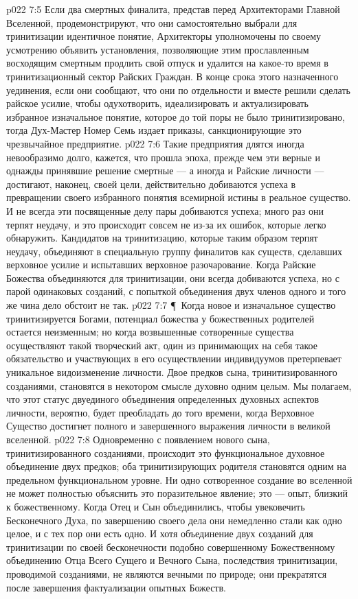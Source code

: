 \vs p022 7:5 Если два смертных финалита, представ перед Архитекторами Главной Вселенной, продемонстрируют, что они самостоятельно выбрали для тринитизации идентичное понятие, Архитекторы уполномочены по своему усмотрению объявить установления, позволяющие этим прославленным восходящим смертным продлить свой отпуск и удалится на какое\hyp{}то время в тринитизационный сектор Райских Граждан. В конце срока этого назначенного уединения, если они сообщают, что они по отдельности и вместе решили сделать райское усилие, чтобы одухотворить, идеализировать и актуализировать избранное изначальное понятие, которое до той поры не было тринитизировано, тогда Дух\hyp{}Мастер Номер Семь издает приказы, санкционирующие это чрезвычайное предприятие.
\vs p022 7:6 Такие предприятия длятся иногда невообразимо долго, кажется, что прошла эпоха, прежде чем эти верные и однажды принявшие решение смертные --- а иногда и Райские личности --- достигают, наконец, своей цели, действительно добиваются успеха в превращении своего избранного понятия всемирной истины в реальное существо. И не всегда эти посвященные делу пары добиваются успеха; много раз они терпят неудачу, и это происходит совсем не из\hyp{}за их ошибок, которые легко обнаружить. Кандидатов на тринитизацию, которые таким образом терпят неудачу, объединяют в специальную группу финалитов как существ, сделавших верховное усилие и испытавших верховное разочарование. Когда Райские Божества объединяются для тринитизации, они всегда добиваются успеха, но с парой одинаковых созданий, с попыткой объединения двух членов одного и того же чина дело обстоит не так.
\vs p022 7:7 \P\ Когда новое и изначальное существо тринитизируется Богами, потенциал божества у божественных родителей остается неизменным; но когда возвышенные сотворенные существа осуществляют такой творческий акт, один из принимающих на себя такое обязательство и участвующих в его осуществлении индивидуумов претерпевает уникальное видоизменение личности. Двое предков сына, тринитизированного созданиями, становятся в некотором смысле духовно одним целым. Мы полагаем, что этот статус двуединого объединения определенных духовных аспектов личности, вероятно, будет преобладать до того времени, когда Верховное Существо достигнет полного и завершенного выражения личности в великой вселенной.
\vs p022 7:8 Одновременно с появлением нового сына, тринитизированного созданиями, происходит это функциональное духовное объединение двух предков; оба тринитизирующих родителя становятся одним на предельном функциональном уровне. Ни одно сотворенное создание во вселенной не может полностью объяснить это поразительное явление; это --- опыт, близкий к божественному. Когда Отец и Сын объединились, чтобы увековечить Бесконечного Духа, по завершению своего дела они немедленно стали как одно целое, и с тех пор они есть одно. И хотя объединение двух созданий для тринитизации по своей бесконечности подобно совершенному Божественному объединению Отца Всего Сущего и Вечного Сына, последствия тринитизации, проводимой созданиями, не являются вечными по природе; они прекратятся после завершения фактуализации опытных Божеств.
